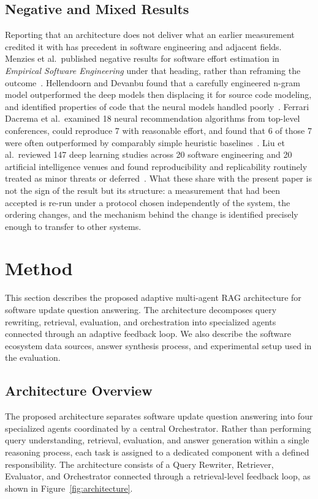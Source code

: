 \documentclass[acmsmall,review,anonymous,screen]{acmart}
\begin{document}
\subsection{Negative and Mixed Results}

Reporting that an architecture does not deliver what an earlier measurement
credited it with has precedent in software engineering and adjacent fields.
Menzies et al.\ published negative results for software effort estimation in
\emph{Empirical Software Engineering} under that heading, rather than reframing
the outcome~\cite{menzies2017negative}. Hellendoorn and Devanbu found that a
carefully engineered n-gram model outperformed the deep models then displacing
it for source code modeling, and identified properties of code that the neural
models handled poorly~\cite{hellendoorn2017dnn}. Ferrari Dacrema et al.\
examined 18 neural recommendation algorithms from top-level conferences, could
reproduce 7 with reasonable effort, and found that 6 of those 7 were often
outperformed by comparably simple heuristic
baselines~\cite{dacrema2019progress}. Liu et al.\ reviewed 147 deep learning
studies across 20 software engineering and 20 artificial intelligence venues and
found reproducibility and replicability routinely treated as minor threats or
deferred~\cite{liu2021reproducibility}. What these share with the present paper
is not the sign of the result but its structure: a measurement that had been
accepted is re-run under a protocol chosen independently of the system, the
ordering changes, and the mechanism behind the change is identified precisely
enough to transfer to other systems.

\section{Method}\label{sec:method}

This section describes the proposed adaptive multi-agent RAG
architecture for software update question answering. The architecture
decomposes query rewriting, retrieval, evaluation, and orchestration
into specialized agents connected through an adaptive feedback loop. We
also describe the software ecosystem data sources, answer synthesis
process, and experimental setup used in the evaluation.

\subsection{Architecture Overview}

The proposed architecture separates software update question answering
into four specialized agents coordinated by a central Orchestrator.
Rather than performing query understanding, retrieval, evaluation, and
answer generation within a single reasoning process, each task is
assigned to a dedicated component with a defined responsibility. The
architecture consists of a Query Rewriter, Retriever, Evaluator, and
Orchestrator connected through a retrieval-level feedback loop, as
shown in Figure~\ref{fig:architecture}.
\end{document}
